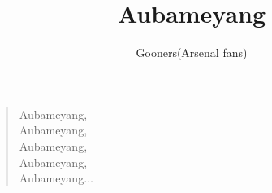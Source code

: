 \documentclass[a4paper,12pt]{article}
\title{Aubameyang}
\author{Gooners(Arsenal fans)}
\date{}
\begin{document}
	
	\maketitle
	
	\begin{verse}
		
		Aubameyang, \\
		Aubameyang, \\
		Aubameyang, \\
		Aubameyang, \\
		Aubameyang$\ldots$
		
	\end{verse}
	
\end{document}
